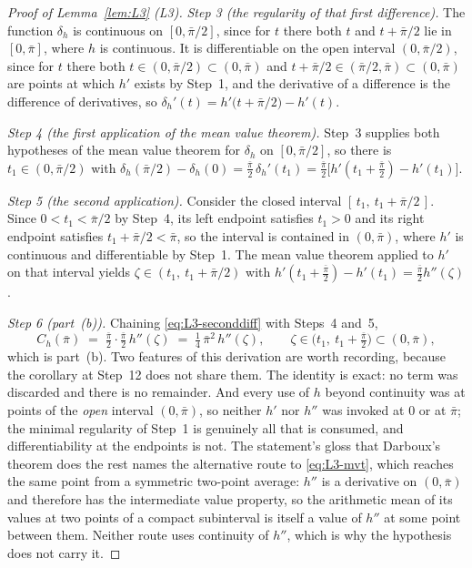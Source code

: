 \begin{proof}[Proof of Lemma~\ref{lem:L3} (L3)]
\emph{Step 3 (the regularity of that first difference).} The function $\delta_h$ is continuous on
$[0,\bar\pi/2]$, since for $t$ there both $t$ and $t+\bar\pi/2$ lie in $[0,\bar\pi]$, where $h$ is
continuous. It is differentiable on the open interval $(0,\bar\pi/2)$, since for $t$ there both
$t \in (0,\bar\pi/2) \subset (0,\bar\pi)$ and
$t+\bar\pi/2 \in (\bar\pi/2,\bar\pi) \subset (0,\bar\pi)$ are points at which $h'$ exists by Step~1,
and the derivative of a difference is the difference of derivatives, so
$\delta_h'(t) = h'\bigl(t+\bar\pi/2\bigr) - h'(t)$.

\emph{Step 4 (the first application of the mean value theorem).} Step~3 supplies both hypotheses of
the mean value theorem for $\delta_h$ on $[0,\bar\pi/2]$, so there is $t_1 \in (0,\bar\pi/2)$ with
$\delta_h(\bar\pi/2) - \delta_h(0)
 = \tfrac{\bar\pi}{2}\,\delta_h'(t_1)
 = \tfrac{\bar\pi}{2}\bigl[h'(t_1+\tfrac{\bar\pi}{2}) - h'(t_1)\bigr]$.

\emph{Step 5 (the second application).} Consider the closed interval
$[\,t_1,\ t_1+\bar\pi/2\,]$. Since $0 < t_1 < \bar\pi/2$ by Step~4, its left endpoint satisfies
$t_1 > 0$ and its right endpoint satisfies $t_1+\bar\pi/2 < \bar\pi$, so the interval is contained in
$(0,\bar\pi)$, where $h'$ is continuous and differentiable by Step~1. The mean value theorem applied
to $h'$ on that interval yields $\zeta \in (t_1,\ t_1+\bar\pi/2)$ with
$h'(t_1+\tfrac{\bar\pi}{2}) - h'(t_1) = \tfrac{\bar\pi}{2}h''(\zeta)$.

\emph{Step 6 (part~(b)).} Chaining \eqref{eq:L3-seconddiff} with Steps~4 and~5,
\begin{equation}
\label{eq:L3-mvt}
C_h(\bar\pi) \;=\; \tfrac{\bar\pi}{2}\cdot\tfrac{\bar\pi}{2}\,h''(\zeta)
 \;=\; \tfrac14\,\bar\pi^2\,h''(\zeta),
\qquad \zeta \in \bigl(t_1,\ t_1+\tfrac{\bar\pi}{2}\bigr) \subset (0,\bar\pi),
\end{equation}
which is part~(b). Two features of this derivation are worth recording, because the corollary at
Step~12 does not share them. The identity is exact: no term was discarded and there is no remainder.
And every use of $h$ beyond continuity was at points of the \emph{open} interval $(0,\bar\pi)$, so
neither $h'$ nor $h''$ was invoked at $0$ or at $\bar\pi$; the minimal regularity of Step~1 is
genuinely all that is consumed, and differentiability at the endpoints is not. The statement's gloss
that Darboux's theorem does the rest names the alternative route to \eqref{eq:L3-mvt}, which reaches
the same point from a symmetric two-point average: $h''$ is a derivative on $(0,\bar\pi)$ and
therefore has the intermediate value property, so the arithmetic mean of its values at two points of
a compact subinterval is itself a value of $h''$ at some point between them. Neither route uses
continuity of $h''$, which is why the hypothesis does not carry it.


\end{proof}

